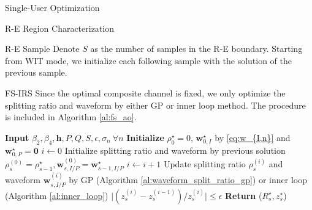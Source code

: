 \documentclass{IEEEtran}
\begin{document}
\begin{section}{Single-User Optimization}
\begin{subsection}{R-E Region Characterization}
		\begin{subsubsection}{R-E Sample}
			Denote $S$ as the number of samples in the R-E boundary. Starting from WIT mode, we initialize each following sample with the solution of the previous sample.
			\begin{paragraph}{FS-IRS}
				Since the optimal composite channel is fixed, we only optimize the splitting ratio and waveform by either GP or inner loop method. The procedure is included in Algorithm \ref{al:fs_ao}.
				\begin{algorithm}
					\caption{FS-IRS: AO Algorithm}
					\label{al:fs_ao}
					\begin{algorithmic}[1]
						\State \textbf{Input} $\beta_2,\beta_4,\boldsymbol{h}, P, Q, S, \epsilon, \sigma_n \ \forall n$
						\State \textbf{Initialize} $\rho_0^{\star} = 0$, $\boldsymbol{w}_{0,I}^{\star}$ by \ref{eq:w_{I,n}} and $\boldsymbol{w}_{0,P}^{\star} = \boldsymbol{0}$
						\State $i \gets 0$\label{st:inner_begin}
						\State Initialize splitting ratio and waveform by previous solution $\rho_s^{(0)} = \rho_{s-1}^{\star}, \boldsymbol{w}_{s,I/P}^{(0)}=\boldsymbol{w}_{s-1,I/P}^{\star}$
						\Repeat
						\State $i \gets i + 1$
						\State Update splitting ratio $\rho_s^{(i)}$ and waveform $\boldsymbol{w}_{s,I/P}^{(i)}$ by GP (Algorithm \ref{al:waveform_split_ratio_gp}) or inner loop (Algorithm \ref{al:inner_loop})
						\Until $\lvert (z_s^{(i)}-z_s^{(i-1)}) / z_s^{(i)} \rvert \le \epsilon$
						\State \textbf{Return} ($R_s^\star, z_s^\star$)
						\EndFor
					\end{algorithmic}
				\end{algorithm}
			\end{paragraph}


\end{subsubsection}
\end{subsection}
\end{section}
\end{document}
